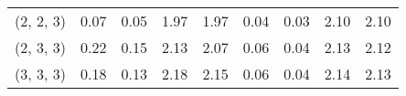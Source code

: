 \begin{tabular}{lrrrrrrrr}
(2, 2, 3)     &                                               0.07 &                                            0.05 &                            1.97 &                                  1.97 &                                               0.04 &                                            0.03 &                            2.10 &                                  2.10 \\
(2, 3, 3)     &                                               0.22 &                                            0.15 &                            2.13 &                                  2.07 &                                               0.06 &                                            0.04 &                            2.13 &                                  2.12 \\
(3, 3, 3)     &                                               0.18 &                                            0.13 &                            2.18 &                                  2.15 &                                               0.06 &                                            0.04 &                            2.14 &                                  2.13 \\
\bottomrule
\end{tabular}
